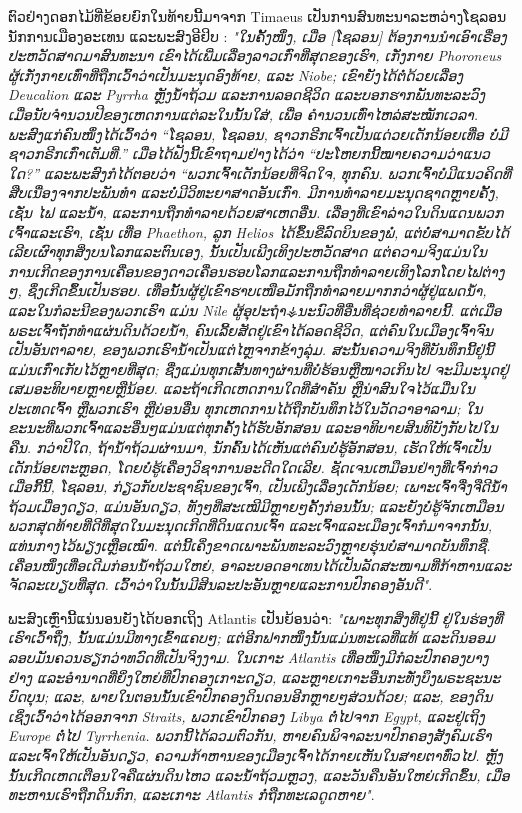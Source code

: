 \documentclass[10pt,twocolumn,letterpaper]{article}
\begin{document}
ຕົວຢ່າງດອກໄມ້ທີ່ຂ້ອຍຍົກໃນທ້າຍນີ້ມາຈາກ Timaeus ເປັນການສົນທະນາລະຫວ່າງໂຊລອນ ນັກການເມືອງອະເທນ ແລະພະສົງອີຢິບ \cite{140} : \textit{"ໃນຄັ້ງໜຶ່ງ, ເມື່ອ [ໂຊລອນ] ຕ້ອງການນໍາເອົາເຣື່ອງປະຫວັດສາດມາສົນທະນາ ເຂົາໄດ້ເພີ່ມເລື່ອງລາວເກົ່າທີ່ສຸດຂອງເຮົາ, ເກັ່ງກາຍ Phoroneus ຜູ້ເກັ່ງກາຍເທົ່າທີ່ຖືກເວົ້າວ່າເປັນມະນຸດອົງທ້າຍ, ແລະ Niobe; ເຂົາຍັງໄດ້ຕໍ່ດ້ວຍເລື່ອງ Deucalion ແລະ Pyrrha ຫຼັງນ້ຳຖ້ວມ ແລະການລອດຊີວິດ ແລະບອກຮາກພັນທະລະວົງ ເມື່ອນັບຈໍານວນປີຂອງເຫດການແຕ່ລະໃນນັ້ນໃສ່, ເພື່ອ ຄຳນວນເທົ່າໄຫລ່ສະໝັກເວລາ. ພະສົງແກ່ຄົນໜຶ່ງໄດ້ເວົ້າວ່າ “ໂຊລອນ, ໂຊລອນ, ຊາວກຣີກເຈົ້າເປັນແດ່ວຍເດັກນ້ອຍເທື່ອ ບໍ່ມີຊາວກຣີກເກົ່າເຕັມທີ່.” ເມື່ອໄດ້ຟັງນີ້ເຂົາຖາມຢ່າງໄດ້ວ່າ “ປະໂຫຍກນີ້ໝາຍຄວາມວ່າແນວໃດ?” ແລະພະສົງກໍໄດ້ຕອບວ່າ “ພວກເຈົ້າເດັກນ້ອຍທີ່ຈິດໃຈ, ທຸກຄົນ. ພວກເຈົ້າບໍ່ມີແນວຄິດທີ່ສືບເນື່ອງຈາກປະພັນທຳ ແລະບໍ່ມີວິທະຍາສາດອັນເກົ່າ. ມີການທຳລາຍມະນຸດຊາດຫຼາຍຄັ້ງ, ເຊັ່ນ ໄຟ ແລະນ້ຳ, ແລະການຖືກທຳລາຍດ້ວຍສາເຫດອື່ນ. ເລື່ອງທີ່ເຂົາລ່າວໃນດິນແດນພວກເຈົ້າແລະເຮົາ, ເຊັ່ນ ເທື່ອ Phaethon, ລູກ Helios ໄດ້ຂຶ້ນຂີ່ລົດບິນຂອງພໍ່, ແຕ່ບໍ່ສາມາດຂັບໄດ້ ເລີຍເຜົາທຸກສິ່ງບນໂລກແລະຕົນເອງ, ນັ້ນເປັນເພີງເທິງປະຫວັດສາດ ແຕ່​ຄວາມ​ຈິງ​ແມ່ນ​ໃນ​ການ​ເກີດ​ຂອງ​ການ​ເຄື່ອນ​ຂອງ​ດາວ​ເຄື່ອນ​ຮອບ​ໂລກ​ແລະ​ການ​ຖືກ​ທຳລາຍ​ເທິງ​ໂລກ​ໂດຍ​​ໄຟ​ຕ່າງ​ໆ, ຊຶ່ງເກີດຂຶ້ນເປັນຮອບ. ເທື່ອນັ້ນຜູ້ຢູ່ເຂົາຮາບເໜືອມັກຖືກທຳລາຍມາກກວ່າຜູ້ຢູ່ແພດນ້ຳ, ແລະໃນກໍລະນີຂອງພວກເຮົາ ແມ່ນ Nile ຜູ້ອຸປະຖຳ⚶ນະນົວທີ່ອື່ນທີ່ຊ່ວຍທຳລາຍນີ້. ແຕ່ເມື່ອພຣະເຈົ້າຖັກທໍາແຜ່ນດິນດ້ວຍນ້ຳ, ຄົນເລີ້ຍສັດຢູ່ເຂົາໄດ້ລອດຊີວິດ, ແຕ່ຄົນໃນເມືອງເຈົ້າຈົນເປັນອັນຕາລາຍ, ຂອງພວກເຮົານ້ຳເປັນແຕ່ໄຫຼຈາກຂ້າງລຸ່ມ. ສະນັ້ນຄວາມຈິງທີ່ບັນທຶກນີ້ຢູ່ນີ້ແມ່ນເກົ່າເກັບໄວ້ຫຼາຍທີ່ສຸດ; ຊື່ງແມ່ນທຸກເສັ້ນທາງຜ່ານທີ່ບໍ່ຮ້ອນຫຼືໜາວເກິນໄປ ຈະມີມະນຸດຢູ່ເສມອະທິບາຍຫຼາຍຫຼືນ້ອຍ. ແລະຖ້າເກີດເຫດການໃດທີ່ສຳຄັນ ຫຼືນ່າສົນໃຈໄວ້ແມື່ນໃນປະເທດເຈົ້າ ຫຼືພວກເຮົາ ຫຼືບ່ອນອື່ນ ທຸກເຫດການໄດ້ຖືກບັນທຶກໄວ້ໃນວັດວາອາລາມ; ໃນຂະນະທີ່ພວກເຈົ້າແລະອື່ນໆແມ່ນແຕ່ທຸກຄັ້ງໄດ້ຮັບອັກສອນ ແລະອາທິບາຍສິນທິບັງກັບໄປໃນຄືນ. ກວ່າປີໃດ, ຖ້ານ້ຳຖ້ວມຜ່ານມາ, ນັກຄົ້ນໄດ້ເຫັນແຕ່ຄົນບໍ່ຮູ້ອັກສອນ, ເຮັດໃຫ້ເຈົ້າເປັນເດັກນ້ອຍຕະຫຼອດ, ໂດຍບໍ່ຮູ້ເຄື່ອງວິຊາການອະດີດໃດເລີຍ. ຊັດເຈນເຫມືອນຢ່າງທີ່ເຈົ້າກ່າວເມື່ອກີ້ນີ້, ໂຊລອນ, ກ່ຽວກັບປະຊາຊົນຂອງເຈົ້າ, ເປັນເພີງເລື່ອງເດັກນ້ອຍ; ເພາະເຈົ້າຈື່ງຈືດີນ້ຳຖ້ວມເມື່ອງດຽວ, ແມ່ນອັນດຽວ, ທັງໆທີ່ສະເໝີມີຫຼາຍໆຄັ້ງກ່ອນນັ້ນ; ແລະຍັງບໍ່ຮູ້ຈັກເຫມືອນພວກສຸດທ້າຍທີ່ດີທີ່ສຸດໃນມະນຸດເກີດທີ່ດິນແດນເຈົ້າ ແລະເຈົ້າແລະເມືອງເຈົ້າກໍມາຈາກນັ້ນ, ແທ່ນກາງໄວ້ພຽງເຫຼືອເໝົາ. ແຕ່ນີ້ເຄິ່ງຂາດເພາະພັນທະລະວົງຫຼາຍຮຸ່ນບໍ່ສາມາດບັນທຶກຊື່. ເຄື່ອນໜຶ່ງເທື່ອເດີມກ່ອນນ້ຳຖ້ວມໃຫຍ່, ອາລະບອດອາເທນໄດ້ເປັນລັດສະໜາມທີ່ກ້າຫານແລະຈັດລະເບຽບທີ່ສຸດ. ເວົ້າວ່າໃນນັ້ນມີສິນລະປະອັນຫຼາຍແລະການປົກຄອງອັນດີ"}.

ພະສົງເຫຼົ່ານີ້ແນ່ນອນຍັງໄດ້ບອກເຖິງ Atlantis ເປັນຍ້ອນວ່າ: \textit{"ເພາະທຸກສິ່ງທີ່ຢູ່ນີ້ ຢູ່ໃນຮ່ອງທີ່ເຮົາເວົ້າຖຶ່ງ, ນັ້ນແມ່ນມີທາງເຂົ້າແຄບໆ; ແຕ່ອີກຟາກໜຶ່ງນັ້ນແມ່ນທະເລທີ່ແທ້ ແລະດິນອອມລອບມັນຄວນຮຽກວ່າທວົດທີ່ເປັນຈິງງາມ. ໃນເກາະ Atlantis ເທື່ອໜຶ່ງມີກໍລະປົກຄອງບາງຢ່າງ ແລະອຳນາດທີ່ຍິ່ງໃຫຍ່ທີ່ປົກຄອງເກາະດຽວ, ແລະຫຼາຍເກາະອື່ນກະທັ່ງບຶງພຣະຊະນະບົດບຸນ; ແລະ, ພາຍໃນຕອນນັ້ນເຂົາປົກຄອງດິນດອນອີກຫຼາຍໆສ່ວນດ້ວຍ; ແລະ, ຂອງດິນເຊິ່ງເວົ້າວ່າໄດ້ອອກຈາກ Straits, ພວກເຂົາປົກຄອງ Libya ຕໍ່ໄປຈາກ Egypt, ແລະຢູ່ເຖິງ Europe ຕໍ່ໄປ Tyrrhenia. ພວກນີ້ໄດ້ລວມຕົວກັນ, ຫາຍຄົນພິຈາລະນາປົກຄອງສັງຄົມເຮົາແລະເຈົ້າໃຫ້ເປັນອັນດຽວ, ຄວາມກ້າຫານຂອງເມືອງເຈົ້າໄດ້ກາຍເຫັນໃນສາຍຕາທົ່ວໄປ. ຫຼັງນັ້ນເກີດເຫດເຕືອນໃຈຄືແຜ່ນດິນໄຫວ ແລະນ້ຳຖ້ວມຫຼວງ, ແລະວັນຄືນອັນໃຫຍ່ເກີດຂຶ້ນ, ເມື່ອທະຫານເຮົາຖືກດິນກົກ, ແລະເກາະ Atlantis ກໍ່ຖືກທະເລດູດຫາຍ"}.
\end{document}
